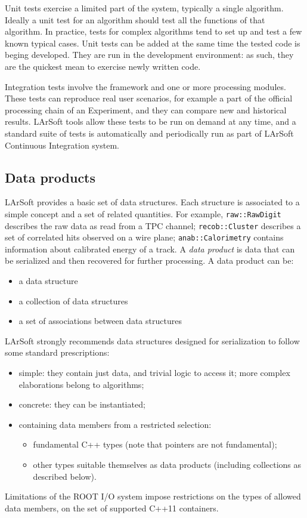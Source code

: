 Unit tests exercise a limited part of the system, typically a single algorithm.
Ideally a unit test for an algorithm should test all the functions of that algorithm.
In practice, tests for complex algorithms tend to set up and test a few known typical cases.
Unit tests can be added at the same time the tested code is beging developed.
They are run in the development environment:
as such, they are the quickest mean to exercise newly written code.

Integration tests involve the framework and one or more processing modules.
These tests can reproduce real user scenarios,
for example a part of the official processing chain of an Experiment,
and they can compare new and historical results.
LArSoft tools allow these tests to be run on demand at any time,
and a standard suite of tests is automatically and periodically run
as part of LArSoft Continuous Integration system.


\subsection{Data products}
\label{ssec:Development:DataProducts}

LArSoft provides a basic set of data structures.
Each structure is associated to a simple concept and a set of related quantities.
For example, \texttt{raw::RawDigit} describes the raw data as read from a TPC channel;
\texttt{recob::Cluster} describes a set of correlated hits observed on a wire plane;
\texttt{anab::Calorimetry} contains information about calibrated energy of a track.
A \emph{data product} is data that can be serialized and then recovered for further processing.
A data product can be:
\begin{itemize}
   \item a data structure
   \item a collection of data structures
   \item a set of associations between data structures
\end{itemize}

LArSoft strongly recommends data structures designed for serialization to follow some standard prescriptions:
\begin{itemize}
   \item simple: they contain just data, and trivial logic to access it;
      more complex elaborations belong to algorithms;
   \item concrete: they can be instantiated;
   \item containing data members from a restricted selection:
      \begin{itemize}
         \item fundamental C++ types (note that pointers are not fundamental);
         \item other types suitable themselves as data products
            (including collections as described below).
      \end{itemize}
\end{itemize}
Limitations of the ROOT I/O system impose restrictions on the types of allowed data members,
\eg on the set of supported C++11 containers.

